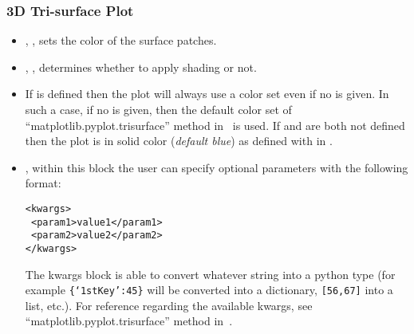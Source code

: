 \subsubsection{3D Tri-surface Plot}
\begin{itemize}
  \item {}, , sets the color of the
  surface patches.
  \item {}, , determines whether 
  to apply shading or not.
  \item {}
  \nb If  is defined then the plot will always use a color set even if no  is given. 
  In such a case, if no  is given, then the default color set of  ``matplotlib.pyplot.trisurface'' method in~\cite{MatPlotLib} is used.
  If  and  are both not defined then the plot is in solid color (\textit{default blue}) as defined with  in   .
  \item {}, within this block the user can specify optional
  parameters with the following format:

\begin{lstlisting}[style=XML]
<kwargs>
 <param1>value1</param1>
 <param2>value2</param2>
</kwargs>
\end{lstlisting}

  The kwargs block is able to convert whatever string into a python type (for
  example  \texttt{\{`1stKey':45\}} will
  be converted into a dictionary, 
   \texttt{[56,67]}  into a list, etc.).
  For reference regarding the available kwargs, see
  ``matplotlib.pyplot.trisurface'' method in~\cite{MatPlotLib}.
\end{itemize}

